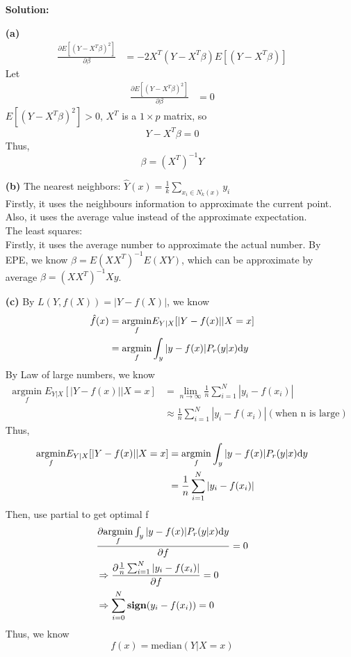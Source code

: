\documentclass[10pt]{article}
\begin{document}
\begin{enumerate}[1.]
\textbf{Solution:}
	\item[\textbf{(a)}] 
	$$
	\begin{aligned}
	\frac{\partial E[(Y-X^T\beta)^2]}{\partial \beta} &= -2X^T(Y-X^T\beta)E[(Y-X^T\beta)] 
	\end{aligned} 
	$$
	Let 
	$$
	\begin{aligned}
	\frac{\partial E[(Y-X^T\beta)^2]}{\partial \beta} &= 0
	\end{aligned} 
	$$
	$E[(Y-X^T\beta)^2]>0$, $X^T$ is a $1\times p$ matrix, so
	$$Y-X^T\beta =0$$
	Thus,
		$$\beta = (X^T)^{-1}Y$$
	\item[\textbf{(b)}] The nearest neighbors: $\hat{Y}(x)=\frac{1}{k}\sum_{x_i\in N_k(x)}y_i$
		  \\Firstly, it uses the neighbours information to approximate the current point. Also, it uses the average value instead of the approximate expectation.
		  \\The least squares: 
		  \\Firstly, it uses the average number to approximate the actual number. By EPE, we know $\beta = E(XX^T)^{-1}E(XY)$, which can be approximate by average $\beta = (XX^T)^{-1}Xy$. 
	\item[\textbf{(c)}] 
			By $L(Y,f(X))=|Y-f(X)|$, we know 
			$$
			\begin{aligned}
				\hat{f}(x) &= \underset{f}{\operatorname{argmin}}E_{Y|X}[|Y-f(x)||X=x]
				\\&= \underset{f}{\operatorname{argmin}}\int_y|y-f(x)|P_r(y|x)\mathrm{d}y
			\end{aligned} 
			$$
			By Law of large numbers, we know 
			$$
			\begin{aligned}
				\underset{f}{\operatorname{argmin}}E_{Y|X}[|Y-f(x)||X=x]
				&= \lim_{n\rightarrow \infty}\frac{1}{n}\sum_{i=1}^N|y_i-f(x_i)|
				\\&\approx \frac{1}{n}\sum_{i=1}^N|y_i-f(x_i)|(\text{when n is large})
			\end{aligned} 
			$$
			Thus,
			$$
			\begin{aligned}
				\underset{f}{\operatorname{argmin}}E_{Y|X}[|Y-f(x)||X=x]
				&= \underset{f}{\operatorname{argmin}}\int_y|y-f(x)|P_r(y|x)\mathrm{d}y
				\\&= \frac{1}{n}\sum_{i=1}^N|y_i-f(x_i)|
			\end{aligned} 
			$$
			Then, use partial to get optimal f
			$$
			\begin{aligned}
				&\frac{\partial \underset{f}{\operatorname{argmin}}\int_y|y-f(x)|P_r(y|x)\mathrm{d}y}{\partial f}=0
				\\&\Rightarrow \frac{\partial \frac{1}{n}\sum_{i=1}^N|y_i-f(x_i)|}{\partial f}=0
				\\&\Rightarrow \sum_{i=0}^N \mathop{\bf sign} (y_i-f(x_i))=0
			\end{aligned} 
			$$
			Thus, we know $$f(x) = \text{median}(Y|X=x)$$
			\newpage


\end{enumerate}
\end{document}
